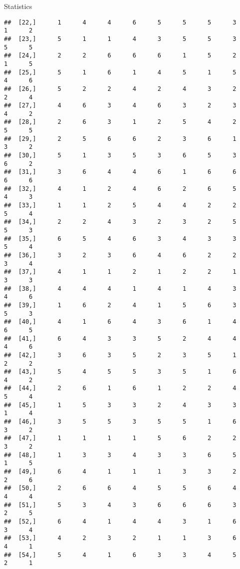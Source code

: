 \documentclass[
  ignorenonframetext,
]{beamer}
\begin{document}
\begin{frame}[fragile]{Statistics}
\begin{verbatim}
##  [22,]      1      4      4      6      5      5      5      3      1      2
##  [23,]      5      1      1      4      3      5      5      3      5      5
##  [24,]      2      2      6      6      6      1      5      2      1      5
##  [25,]      5      1      6      1      4      5      1      5      4      6
##  [26,]      5      2      2      4      2      4      3      2      2      4
##  [27,]      4      6      3      4      6      3      2      3      4      2
##  [28,]      2      6      3      1      2      5      4      2      5      5
##  [29,]      2      5      6      6      2      3      6      1      3      2
##  [30,]      5      1      3      5      3      6      5      3      6      2
##  [31,]      3      6      4      4      6      1      6      6      6      6
##  [32,]      4      1      2      4      6      2      6      5      4      3
##  [33,]      1      1      2      5      4      4      2      2      5      4
##  [34,]      2      2      4      3      2      3      2      5      5      3
##  [35,]      6      5      4      6      3      4      3      3      5      4
##  [36,]      3      2      3      6      4      6      2      2      3      4
##  [37,]      4      1      1      2      1      2      2      1      3      3
##  [38,]      4      4      4      1      4      1      4      3      4      6
##  [39,]      1      6      2      4      1      5      6      3      5      3
##  [40,]      4      1      6      4      3      6      1      4      6      5
##  [41,]      6      4      3      3      5      2      4      4      4      6
##  [42,]      3      6      3      5      2      3      5      1      2      2
##  [43,]      5      4      5      5      3      5      1      6      4      2
##  [44,]      2      6      1      6      1      2      2      4      5      4
##  [45,]      1      5      3      3      2      4      3      3      1      4
##  [46,]      3      5      5      3      5      5      1      6      3      2
##  [47,]      1      1      1      1      5      6      2      2      3      2
##  [48,]      1      3      3      4      3      3      6      5      1      5
##  [49,]      6      4      1      1      1      3      3      2      2      6
##  [50,]      2      6      6      4      5      5      6      4      4      4
##  [51,]      5      3      4      3      6      6      6      3      2      5
##  [52,]      6      4      1      4      4      3      1      6      3      4
##  [53,]      4      2      3      2      1      1      3      6      4      1
##  [54,]      5      4      1      6      3      3      4      5      2      1

\end{verbatim}
\end{frame}
\end{document}
